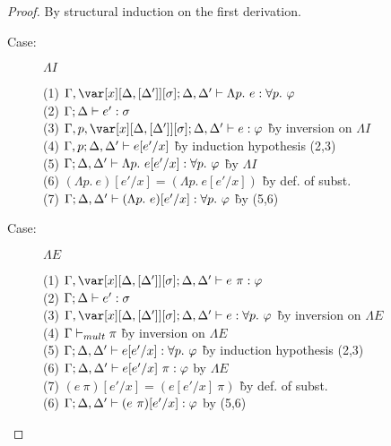 
\DeltaSubstitutionLemma

\begin{proof}
By structural induction on the first derivation.

\begin{description}

\item[Case:] $\Lambda I$
\begin{tabbing}
    (1) $\G, \xD; \D, \D' \vdash \Lambda p.~e : \forall p.~\vp$\\
    (2) $\Gamma; \Delta \vdash e' : \sigma$\\
    (3) $\G, p, \xD; \D, \D' \vdash e : \vp$ \` by inversion on $\Lambda I$\\
    (4) $\Gamma, p; \Delta, \Delta' \vdash e[e'/x]$ \` by induction hypothesis (2,3)\\
    (5) $\Gamma; \Delta, \Delta' \vdash \Lambda p.~e[e'/x] : \forall p.~\varphi$ \` by $\Lambda I$ \\
    (6) $(\Lambda p.~e)[e'/x] = (\Lambda p.~e[e'/x])$ \` by def. of subst.\\
    (7) $\Gamma; \Delta, \Delta' \vdash (\Lambda p.~e)[e'/x] : \forall p.~\varphi$ \` by (5,6)\\
\end{tabbing}

\item[Case:] $\Lambda E$
\begin{tabbing}
    (1) $\G,\xD; \D,\D' \vdash e~\pi : \vp$\\
    (2) $\Gamma; \Delta \vdash e' : \sigma$\\
    (3) $\G,\xD; \D, \D' \vdash e : \forall p.~\vp$ \` by inversion on $\Lambda E$\\
    (4) $\Gamma \vdash_{mult} \pi$ \` by inversion on $\Lambda E$\\
    (5) $\Gamma; \Delta, \Delta' \vdash e[e'/x] : \forall p.~\varphi$ \` by induction hypothesis (2,3)\\
    (6) $\Gamma; \Delta, \Delta' \vdash e[e'/x]~\pi : \varphi$ by $\Lambda E$\\
    (7) $(e~\pi)[e'/x] = (e[e'/x]~\pi)$ \` by def. of subst.\\
    (6) $\Gamma; \Delta, \Delta' \vdash (e~\pi)[e'/x] : \varphi$ by (5,6)\\
\end{tabbing}


\end{description}
\end{proof}
